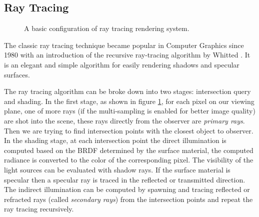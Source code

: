 \subsection{Ray Tracing} 
\label{sec:mc_rt} 

\begin{figure}[htp] 
    \centering 
    \renewcommand{\thefigure}{\thechapter.\arabic{figure}}
    \caption[Ray Tracing System Configuration]{A basic configuration of ray tracing rendering system.}
    \label{fig:ray_tracing} 
\end{figure} 

The classic ray tracing technique became popular in Computer Graphics since 1980 with an introduction of the recursive ray-tracing algorithm by Whitted \cite{Whitted1980}. It is an elegant and simple algorithm for easily rendering shadows and specular surfaces. 

The ray tracing algorithm can be broke down into two stages: intersection query and shading. In the first stage, as shown in figure \ref{fig:ray_tracing}, for each pixel on our viewing plane, one of more rays (if the multi-sampling is enabled for better image quality) are shot into the scene, these rays directly from the observer are \emph{primary rays}. Then we are trying to find intersection points with the closest object to observer. In the shading stage, at each intersection point the direct illumination is computed based on the BRDF determined by the surface material, the computed radiance is converted to the color of the corresponding pixel. The visibility of the light sources can be evaluated with shadow rays. If the surface material is specular then a specular ray is traced in the reflected or transmitted direction. The indirect illumination can be computed by spawning and tracing reflected or refracted rays (called \emph{secondary rays}) from the intersection points and repeat the ray tracing recursively. 

